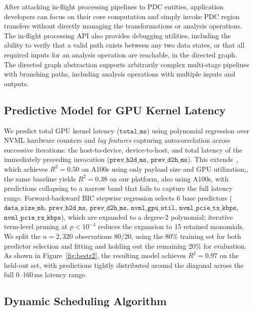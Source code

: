 After attaching in-flight processing pipelines to PDC entities, application developers can focus on their core computation and simply invoke PDC region transfers without directly managing the transformations or analysis operations. The in-flight processing API also provides debugging utilities, including the ability to verify that a valid path exists between any two data states, or that all required inputs for an analysis operation are reachable, in the directed graph. The directed graph abstraction supports arbitrarily complex multi-stage pipelines with branching paths, including analysis operations with multiple inputs and outputs.

\subsection{Predictive Model for GPU Kernel Latency}
\label{sec:model}

We predict total GPU kernel latency ($\texttt{total\_ms}$) using polynomial regression over NVML hardware counters and \emph{lag features} capturing autocorrelation across successive iterations: the host-to-device, device-to-host, and total latency of the immediately preceding invocation ($\texttt{prev\_h2d\_ms}$, $\texttt{prev\_d2h\_ms}$). This extends~\cite{ravi2023runway}, which achieves $R^2 = 0.50$ on A100s using only payload size and GPU utilization;, the same baseline yields $R^2 = 0.38$ on our platform, also using A100s, with predictions collapsing to a narrow band that fails to capture the full latency range. Forward-backward BIC stepwise regression selects 6 base predictors ($\texttt{data\_size\_mb}$, $\texttt{prev\_h2d\_ms}$, $\texttt{prev\_d2h\_ms}$, $\texttt{nvml\_gpu\_util}$, $\texttt{nvml\_pcie\_tx\_kbps}$, $\texttt{nvml\_pcie\_rx\_kbps}$), which are expanded to a degree-2 polynomial; iterative term-level pruning at $p < 10^{-4}$ reduces the expansion to 15 retained monomials. We split the $n = 2{,}320$ observations 80/20, using the 80\% training set for both predictor selection and fitting and holding out the remaining 20\% for evaluation. As shown in Figure~\ref{fig:bestr2}, the resulting model achieves $R^2 = 0.97$ on the held-out set, with predictions tightly distributed around the diagonal across the full 0--160\,ms latency range.

\subsection{Dynamic Scheduling Algorithm}
\label{sec:sched}

